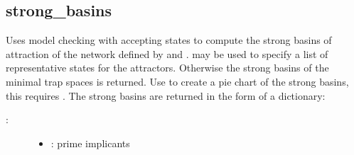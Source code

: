 \documentclass[letterpaper,10pt,english]{sphinxmanual}
\begin{document}
\subsection{strong\_basins}
\label{\detokenize{Basins:id5}}\label{\detokenize{Basins:strong-basins}}

\begin{fulllineitems}
\label{\detokenize{Basins:PyBoolNet.Basins.strong_basins}}
Uses model checking with accepting states to compute the strong basins of attraction of the network defined by  and .
 may be used to specify a list of representative states for the attractors.
Otherwise the strong basins of the minimal trap spaces is returned.
Use  to create a pie chart of the strong basins, this requires .
The strong basins are returned in the form of a dictionary:

\begin{sphinxVerbatim}[commandchars=\\\{\}]
     
          
                         
                          
               
\end{sphinxVerbatim}
\begin{description}
\item[{:}] \leavevmode\begin{itemize}
\item {} 
: prime implicants


\end{itemize}
\end{description}
\end{fulllineitems}
\end{document}
